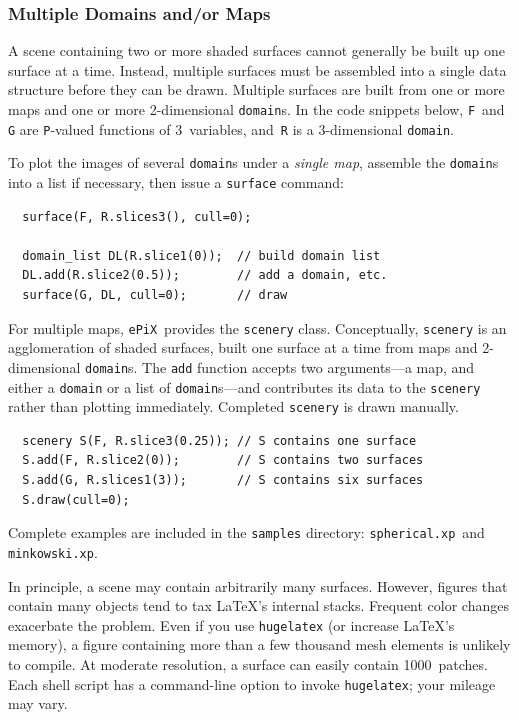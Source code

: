 \documentclass[12pt,letterpaper]{book}
\newcommand{\code}[1]{\texttt{#1}}
\newcommand{\filename}[1]{\texttt{#1}}
\newcommand{\ePiX}{\code{ePiX}}
\newcommand{\findex}[1]{\ignorespaces}
\begin{document}
\subsubsection*{Multiple Domains and/or Maps}

A scene containing two or more shaded surfaces cannot generally be
built up one surface at a time. Instead, multiple surfaces must be
assembled into a single data structure before they can be drawn.
Multiple surfaces are built from one or more maps and one or more
2-dimensional \code{domain}s. In the code snippets below, \code{F}~and
\code{G} are \code{P}-valued functions of 3~variables, and~\code{R} is
a 3-dimensional \code{domain}.

To plot the images of several \code{domain}s under a \emph{single
map}, assemble the \code{domain}s into a list if necessary, then issue
a \code{surface} command:
\findex{surface}
\findex{domain\_list}
\findex{domain\_list.add}
\begin{verbatim}
  surface(F, R.slices3(), cull=0);

  domain_list DL(R.slice1(0));  // build domain list
  DL.add(R.slice2(0.5));        // add a domain, etc.
  surface(G, DL, cull=0);       // draw
\end{verbatim}
For multiple maps, \ePiX\ provides the \code{scenery}
class. Conceptually, \code{scenery} is an agglomeration of shaded
surfaces, built one surface at a time from maps and 2-dimensional
\code{domain}s. The \code{add} function accepts two arguments---a map,
and either a \code{domain} or a list of \code{domain}s---and
contributes its data to the \code{scenery} rather than plotting
immediately. Completed \code{scenery} is drawn manually.
\findex{scenery}
\findex{scenery.add}
\findex{scenery.draw}
\begin{verbatim}
  scenery S(F, R.slice3(0.25)); // S contains one surface
  S.add(F, R.slice2(0));        // S contains two surfaces
  S.add(G, R.slices1(3));       // S contains six surfaces
  S.draw(cull=0);
\end{verbatim}
Complete examples are included in the \filename{samples} directory:
\filename{spherical.xp}~and \filename{minkowski.xp}.

In principle, a scene may contain arbitrarily many surfaces. However,
figures that contain many objects tend to tax \LaTeX's internal
stacks. Frequent color changes exacerbate the problem.  Even if you
use \filename{hugelatex} (or increase \LaTeX's memory), a figure
containing more than a few thousand mesh elements is unlikely to
compile. At moderate resolution, a surface can easily contain
1000~patches. Each shell script has a command-line option to invoke
\filename{hugelatex}; your mileage may vary.
\end{document}
